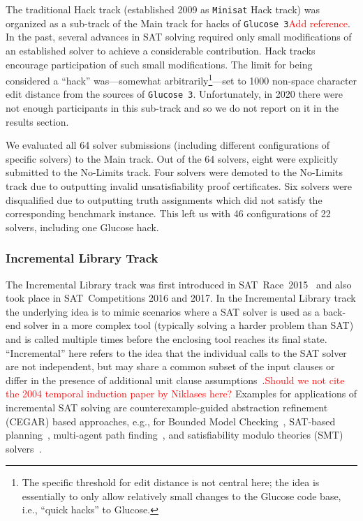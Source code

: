 \documentclass{elsarticle}
\newcommand{\solver}[1]{\texttt{#1}}
\begin{document}
The traditional Hack track (established 
2009 as \solver{Minisat} Hack track) was organized as a sub-track of the Main track for hacks of \solver{Glucose 3}\textcolor{red}{Add reference}. 
In the past, several advances in SAT solving required only small modifications of an established solver to achieve a considerable contribution. 
Hack tracks encourage participation of such small modifications. 
The limit for being considered a ``hack'' was---somewhat arbitrarily\footnote{The specific threshold for edit distance is not central here; the idea is essentially to only allow relatively small changes to the Glucose
code base, i.e., ``quick hacks'' to Glucose.}---set to 1000 non-space character edit distance from the sources of \solver{Glucose 3}. 
Unfortunately, in 2020 there were not enough participants in this sub-track and so we do not report on it in the results section.

We evaluated all 64 solver submissions (including different configurations of specific solvers) 
to the Main track. Out of the 64 solvers, eight were explicitly submitted to the No-Limits track. Four solvers
 were demoted to the No-Limits track due to outputting invalid unsatisfiability proof certificates. 
Six solvers were disqualified due to outputting truth assignments which did not satisfy the corresponding benchmark instance.
This left us with 46 configurations of 22 solvers, including %
one Glucose hack.


\subsubsection{Incremental Library Track}

The Incremental Library track was first introduced in SAT~Race~2015~\cite{Balyo:2015:SATRace} and also took place in SAT~Competitions 2016 and 2017.
In the Incremental Library track the underlying idea is to mimic scenarios
where a SAT solver is used as a back-end solver in a more complex tool
(typically solving a harder problem than SAT) and is called multiple times before 
the enclosing tool reaches its final state. 
``Incremental'' here refers to the idea that the individual calls to the SAT solver are not independent, but may share a common subset of the input clauses or differ in the presence of additional unit clause assumptions~\cite{Nadel:2014:Incremental,Fazekas:2019:IncrementalInprocessing}.\textcolor{red}{Should we not cite the 2004 temporal induction paper by Niklases here?}
Examples for applications of incremental SAT solving are counterexample-guided abstraction refinement (CEGAR) based approaches, e.g., for Bounded Model Checking~\cite{Strichman:2005:ARBMC}, SAT-based planning~\cite{Balyo:2017:IncrPlanning},
multi-agent path finding~\cite{DBLP:conf/ijcai/Surynek19}, and satisfiability modulo theories (SMT) solvers~\cite{Brummayer:2009:Boolector}. 
\end{document}
